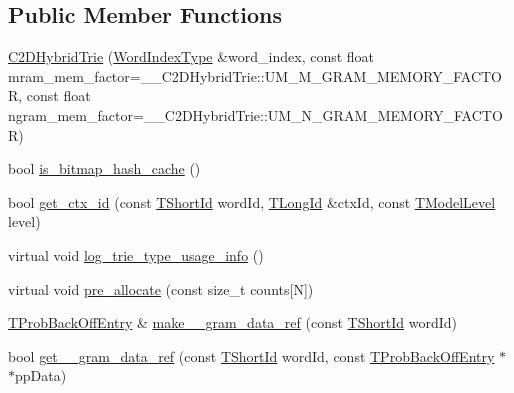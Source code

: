 \subsection*{Public Member Functions}
\begin{DoxyCompactItemize}
\item 
\hyperlink{classuva_1_1smt_1_1tries_1_1_c2_d_hybrid_trie_a390e38bc6e12db2878af63bacabf2e05}{C2\+D\+Hybrid\+Trie} (\hyperlink{classuva_1_1smt_1_1tries_1_1_word_index_trie_base_a30c4fffe3a3423c87b229b66340dd2f8}{Word\+Index\+Type} \&word\+\_\+index, const float mram\+\_\+mem\+\_\+factor=\+\_\+\+\_\+\+C2\+D\+Hybrid\+Trie\+::\+U\+M\+\_\+\+M\+\_\+\+G\+R\+A\+M\+\_\+\+M\+E\+M\+O\+R\+Y\+\_\+\+F\+A\+C\+T\+O\+R, const float ngram\+\_\+mem\+\_\+factor=\+\_\+\+\_\+\+C2\+D\+Hybrid\+Trie\+::\+U\+M\+\_\+\+N\+\_\+\+G\+R\+A\+M\+\_\+\+M\+E\+M\+O\+R\+Y\+\_\+\+F\+A\+C\+T\+O\+R)
\item 
bool \hyperlink{classuva_1_1smt_1_1tries_1_1_c2_d_hybrid_trie_a074cc2aa4c9a9732a420d54b1f27eb9e}{is\+\_\+bitmap\+\_\+hash\+\_\+cache} ()
\item 
bool \hyperlink{classuva_1_1smt_1_1tries_1_1_c2_d_hybrid_trie_a499cc5205dd62389c416c22e4f23c1f5}{get\+\_\+ctx\+\_\+id} (const \hyperlink{namespaceuva_1_1smt_1_1hashing_adcf22e1982ad09d3a63494c006267469}{T\+Short\+Id} word\+Id, \hyperlink{namespaceuva_1_1smt_1_1hashing_a5992ac0dea0fb3226fb403ede09fad55}{T\+Long\+Id} \&ctx\+Id, const \hyperlink{namespaceuva_1_1smt_1_1tries_a20577a44b3a42d26524250634379b7cb}{T\+Model\+Level} level)
\item 
virtual void \hyperlink{classuva_1_1smt_1_1tries_1_1_c2_d_hybrid_trie_a05c3ebcd01018812d3b149cc2ecdccad}{log\+\_\+trie\+\_\+type\+\_\+usage\+\_\+info} ()
\item 
virtual void \hyperlink{classuva_1_1smt_1_1tries_1_1_c2_d_hybrid_trie_a792b513cbb0a298b3de40198fdd8e091}{pre\+\_\+allocate} (const size\+\_\+t counts\mbox{[}N\mbox{]})
\item 
\hyperlink{structuva_1_1smt_1_1tries_1_1_t_prob_back_off_entry}{T\+Prob\+Back\+Off\+Entry} \& \hyperlink{classuva_1_1smt_1_1tries_1_1_c2_d_hybrid_trie_a7f4253f810c679bdcddabcfa360ed0e1}{make\+\_\+\_\+gram\+\_\+data\+\_\+ref} (const \hyperlink{namespaceuva_1_1smt_1_1hashing_adcf22e1982ad09d3a63494c006267469}{T\+Short\+Id} word\+Id)
\item 
bool \hyperlink{classuva_1_1smt_1_1tries_1_1_c2_d_hybrid_trie_afa55e767c01f1b1536a99bd07d259af1}{get\+\_\+\_\+gram\+\_\+data\+\_\+ref} (const \hyperlink{namespaceuva_1_1smt_1_1hashing_adcf22e1982ad09d3a63494c006267469}{T\+Short\+Id} word\+Id, const \hyperlink{structuva_1_1smt_1_1tries_1_1_t_prob_back_off_entry}{T\+Prob\+Back\+Off\+Entry} $\ast$$\ast$pp\+Data)
$$
\end{DoxyCompactItemize}
